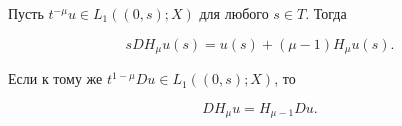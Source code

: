 \begin{thms}\label{HDiff}


Пусть $t^{-\mu}u \in L_1((0,s);X)$ для любого $s \in T$. Тогда


\begin{equation}\label{FormDiff1}


sDH_\mu u(s)=u(s)+(\mu-1)H_\mu u(s).


\end{equation}


Если к тому же $t^{1-\mu}D u \in L_1((0,s);X)$, то


\begin{equation}\label{FormDiff}


DH_\mu u=H_{\mu-1} D u.


\end{equation}


\end{thms}





